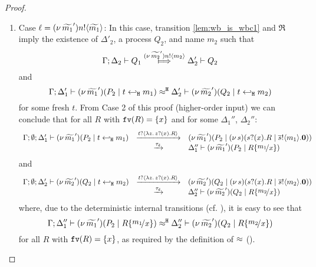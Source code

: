 \begin{proof}
\begin{enumerate}[1.]
		\item	Case $\ell = (\nu\, \widetilde{m_1}') n ! \langle \widetilde{m_1} \rangle$: In this case, 
 transition \eqref{lem:wb_is_wbc1} and $\Re$ imply the existence of $\Delta'_2$, a process $Q_2$, and name $m_2$ such that 
			\[
				\horel{\Gamma}{\Delta_2}{Q_1}{\Hby{\news{\widetilde{m_2}'} \bactout{n}{m_2}}}{\Delta_2'}{Q_2}
			\]
				\noi and
			\[
				\Gamma; \Delta_1' \vdash (\nu\, \widetilde{m_1}')(P_2 \;|\; t \hookleftarrow_{\mathtt{H}} m_1) \approx^\mathtt{H} \Delta_2' \vdash (\nu\, \widetilde{m_2}')(Q_2 \;|\; t \hookleftarrow_{\mathtt{H}} m_2)
			\]
			 for some fresh $t$.
				\noi From Case 2  of this proof (higher-order input)
				we can conclude that for all $R$ with $\mathtt{fv}(R) = \{x\}$ and for some $\Delta_1''$, $\Delta_2''$:
			\[
				\begin{array}{rcl}
					\Gamma; \es; \Delta_1' \proves \newsp{\widetilde{m_1}'}{P_2 \Par \htrigger{t}{m_1}} 
					& \by{\bactinp{t}{\abs{z}{\binp{z}{x} R}}}& \newsp{\widetilde{m_1}'}{P_2 \Par \newsp{s}{\binp{s}{x} R \Par \bout{\dual{s}}{m_1} \inact }}\\
					& \by{\dtau}   &\Delta_1'' \proves \newsp{\widetilde{m_1}'}{P_2 \Par  R \subst{m_1}{x}}
				\end{array}
			\]
				\noi and
			\[
				\begin{array}{rcl}
					\Gamma; \es; \Delta_2' \proves \newsp{\widetilde{m_2}'}{Q_2 \Par \htrigger{t}{m_2} } 
					& \by{\bactinp{t}{\abs{z}{\binp{z}{x} R}}} &\newsp{\widetilde{m_2}'}{Q_2 \Par \newsp{s}{\binp{s}{x} R \Par \bout{\dual{s}}{m_2} \inact}}\\
					& \by{\dtau} &\Delta_2'' \proves \newsp{\widetilde{m_2}'}{Q_2 \Par  R \subst{m_2}{x}}
				\end{array}
			\]
			where, due to the deterministic internal transitions (cf. ), it is easy to see that 
			\[
				\horel{\Gamma}{\Delta_1''}{\newsp{\widetilde{m_1}'}{P_2 \Par  R \subst{m_1}{x}}}{\hwb}{\Delta_2''}{\newsp{\widetilde{m_2}'}{Q_2 \Par R \subst{m_2}{x}} }
			\]
			for all $R$ with $\mathtt{fv}(R) = \{x\}$, as required by the definition of $\approx$ ().


\end{enumerate}
\end{proof}
